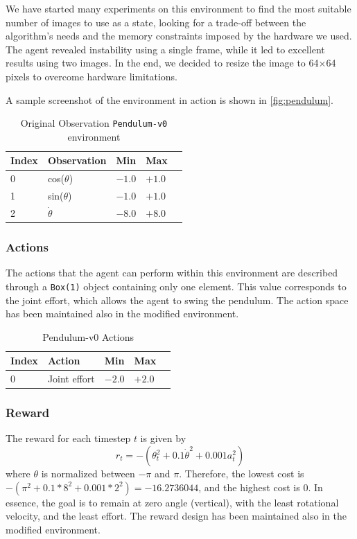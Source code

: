 We have started many experiments on this environment to find the most suitable number of images to use as a state, looking for a trade-off between the algorithm’s needs and the memory constraints imposed by the hardware we used. The agent revealed instability using a single frame, while it led to excellent results using two images. In the end, we decided to resize the image to 64$\times$64 pixels to overcome hardware limitations.

A sample screenshot of the environment in action is shown in \vref{fig:pendulum}.

\begin{table}[!h]
	\centering
	\caption{Original Observation \texttt{Pendulum-v0} environment}
	\label{table:pendulum_obs}
	\begin{tabular}{@{}lllll@{}}
		\toprule
		Index & Observation    & Min    & Max    \\ \midrule
		0     & cos($\theta$)  & $-1.0$ & $+1.0$ \\
		1     & sin($\theta$)  & $-1.0$ & $+1.0$ \\
		2     & $\dot{\theta}$ & $-8.0$ & $+8.0$ \\
		\bottomrule
	\end{tabular}
\end{table}

\subsubsection{Actions}

The actions that the agent can perform within this environment are described through a \texttt{Box(1)} object containing only one element. This value corresponds to the joint effort, which allows the agent to swing the pendulum. The action space has been maintained also in the modified environment.

\begin{table}[!h]
	\centering
	\caption{Pendulum-v0 Actions }
	\label{mountain_action}
	\begin{tabular}{@{}lllll@{}}
		\toprule
		Index & Action       & Min    & Max    \\ \midrule
		0     & Joint effort & $-2.0$ & $+2.0$ \\
		\bottomrule
	\end{tabular}
\end{table}

\subsubsection{Reward}
The reward for each timestep $t$ is given by \[r_t = -(\theta_t^2 + 0.1 \dot{\theta}^2 + 0.001 a_t^2)\]
where $\theta$ is normalized between $-\pi$ and $\pi$. Therefore, the lowest cost is $-(\pi^2 + 0.1*8^2 + 0.001*2^2) = -16.2736044$, and the highest cost is $0$. In essence, the goal is to remain at zero angle (vertical), with the least rotational velocity, and the least effort.
The reward design has been maintained also in the modified environment.


